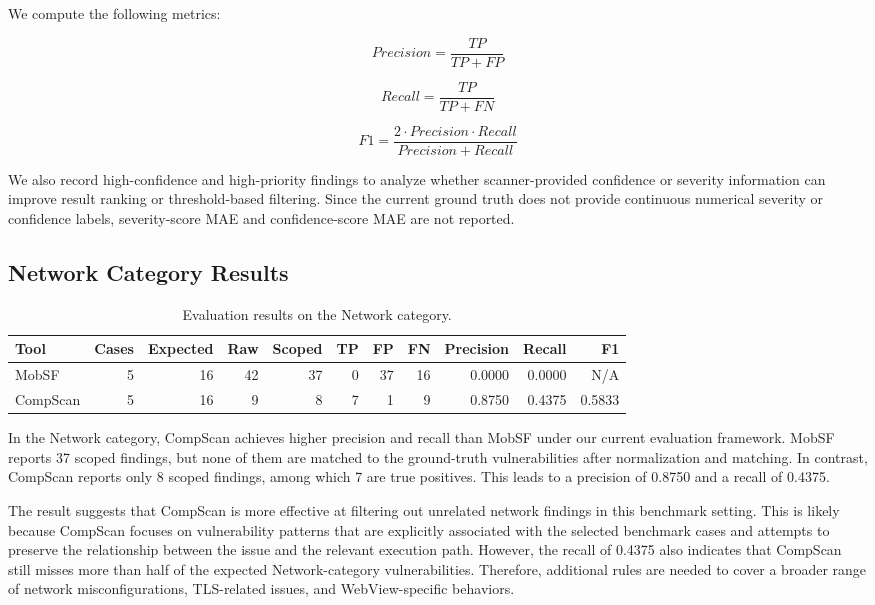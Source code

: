 \documentclass[sigconf, nonacm]{acmart}
\begin{document}
We compute the following metrics:

\[
Precision = \frac{TP}{TP + FP}
\]

\[
Recall = \frac{TP}{TP + FN}
\]

\[
F1 = \frac{2 \cdot Precision \cdot Recall}{Precision + Recall}
\]

We also record high-confidence and high-priority findings to analyze whether scanner-provided confidence or severity information can improve result ranking or threshold-based filtering. Since the current ground truth does not provide continuous numerical severity or confidence labels, severity-score MAE and confidence-score MAE are not reported.

\subsection{Network Category Results}

\begin{table}[t]
\centering
\scriptsize
\caption{Evaluation results on the Network category.}
\label{tab:network-results}
\begin{tabular}{lrrrrrrrrrr}
\toprule
Tool & Cases & Expected & Raw & Scoped & TP & FP & FN & Precision & Recall & F1 \\
\midrule
MobSF & 5 & 16 & 42 & 37 & 0 & 37 & 16 & 0.0000 & 0.0000 & N/A \\
CompScan & 5 & 16 & 9 & 8 & 7 & 1 & 9 & 0.8750 & 0.4375 & 0.5833 \\
\bottomrule
\end{tabular}
\end{table}

In the Network category, CompScan achieves higher precision and recall than MobSF under our current evaluation framework. MobSF reports 37 scoped findings, but none of them are matched to the ground-truth vulnerabilities after normalization and matching. In contrast, CompScan reports only 8 scoped findings, among which 7 are true positives. This leads to a precision of 0.8750 and a recall of 0.4375.

The result suggests that CompScan is more effective at filtering out unrelated network findings in this benchmark setting. This is likely because CompScan focuses on vulnerability patterns that are explicitly associated with the selected benchmark cases and attempts to preserve the relationship between the issue and the relevant execution path. However, the recall of 0.4375 also indicates that CompScan still misses more than half of the expected Network-category vulnerabilities. Therefore, additional rules are needed to cover a broader range of network misconfigurations, TLS-related issues, and WebView-specific behaviors.
\end{document}
